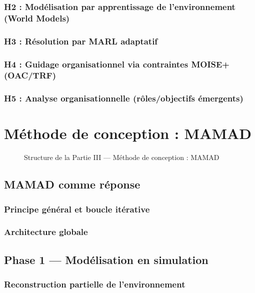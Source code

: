 \documentclass[ twoside,openright,titlepage,numbers=noenddot,headinclude,%
                footinclude=true,cleardoublepage=empty,abstractoff, %
                BCOR=5mm,paper=a4,fontsize=11pt,%
                french,american,%
                ]{scrreprt}
\begin{document}
\section{H2 : Modélisation par apprentissage de l'environnement (World Models)}
\section{H3 : Résolution par MARL adaptatif}
\section{H4 : Guidage organisationnel via contraintes MOISE+ (OAC/TRF)}
\section{H5 : Analyse organisationnelle (rôles/objectifs émergents)}

\part{Méthode de conception : MAMAD}

\begin{figure}[h!]
    \centering
    
    \caption{Structure de la Partie III — Méthode de conception : MAMAD}
\end{figure}

\chapter{MAMAD comme réponse}

\section{Principe général et boucle itérative}

\section{Architecture globale}

\chapter{Phase 1 — Modélisation en simulation}
\section{Reconstruction partielle de l'environnement}
\end{document}
